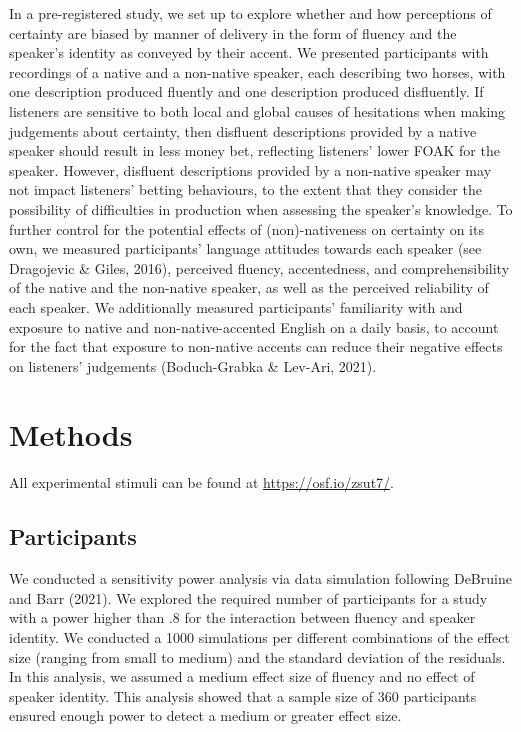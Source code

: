 \documentclass[
  man,floatsintext]{apa6}
\begin{document}
In a pre-registered study, we set up to explore whether and how perceptions of certainty are biased by manner of delivery in the form of fluency and the speaker's identity as conveyed by their accent. We presented participants with recordings of a native and a non-native speaker, each describing two horses, with one description produced fluently and one description produced disfluently. If listeners are sensitive to both local and global causes of hesitations when making judgements about certainty, then disfluent descriptions provided by a native speaker should result in less money bet, reflecting listeners' lower FOAK for the speaker. However, disfluent descriptions provided by a non-native speaker may not impact listeners' betting behaviours, to the extent that they consider the possibility of difficulties in production when assessing the speaker's knowledge. To further control for the potential effects of (non)-nativeness on certainty on its own, we measured participants' language attitudes towards each speaker (see Dragojevic \& Giles, 2016), perceived fluency, accentedness, and comprehensibility of the native and the non-native speaker, as well as the perceived reliability of each speaker. We additionally measured participants' familiarity with and exposure to native and non-native-accented English on a daily basis, to account for the fact that exposure to non-native accents can reduce their negative effects on listeners' judgements (Boduch-Grabka \& Lev-Ari, 2021).

\hypertarget{methods}{%
\section{Methods}\label{methods}}

All experimental stimuli can be found at \url{https://osf.io/zsut7/}.

\hypertarget{participants}{%
\subsection{Participants}\label{participants}}

We conducted a sensitivity power analysis via data simulation following DeBruine and Barr (2021). We explored the required number of participants for a study with a power higher than .8 for the interaction between fluency and speaker identity. We conducted a 1000 simulations per different combinations of the effect size (ranging from small to medium) and the standard deviation of the residuals. In this analysis, we assumed a medium effect size of fluency and no effect of speaker identity. This analysis showed that a sample size of 360 participants ensured enough power to detect a medium or greater effect size.
\end{document}

